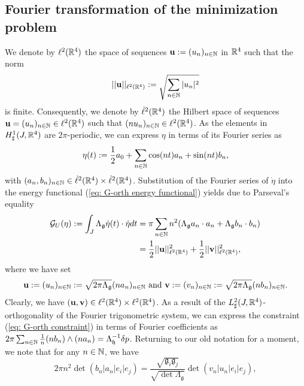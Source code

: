 \subsection{Fourier transformation of the minimization problem}
We denote by $\ell^2(\mathbb{R}^4)$ the space of sequences $\mathbf{u} := (u_n)_{n \in \mathbb{N}}$ in $\mathbb{R}^4$ such that the norm
\begin{equation}
	||\mathbf{u}||_{\ell^2(\mathbb{R}^4)} := \sqrt{ \sum_{n \in \mathbb{N}} |u_n|^2 }
\end{equation}
is finite. Consequently, we denote by $\dot{\ell}^2(\mathbb{R}^4)$ the Hilbert space of sequences $\mathbf{u} = (u_n)_{n \in \mathbb{N}} \in \ell^2(\mathbb{R}^4)$ such that $(n u_n)_{n \in \mathbb{N}} \in \ell^2(\mathbb{R}^4)$. As the elements in $H_{\sharp}^{1}(J, \mathbb{R}^4)$ are $2\pi$-periodic, we can express $\eta$ in terms of its Fourier series as
\begin{equation}
\eta(t) := \frac{1}{2} a_0 + \sum_{n \in \mathbb{N}} \cos(nt) a_n + \sin(n t) b_n,
\end{equation}
with $(a_n, b_n)_{n \in \mathbb{N}} \in \dot{\ell}^2(\mathbb{R}^4) \times \dot{\ell}^2(\mathbb{R}^4)$. Substitution of the Fourier series of $\dot{\eta}$ into the energy functional (\ref{eq: G-orth energy functional}) yields due to Parseval's equality
\begin{align}
\mathcal{G}_{U} (\eta) := \int_{J} \Lambda_{\mathfrak{g}} \dot{\eta}(t) \cdot \dot{\eta} dt &= \pi \sum_{n  \in \mathbb{N}} n^2(\Lambda_{\mathfrak{g}} a_n \cdot a_n + \Lambda_{\mathfrak{g}} b_n \cdot b_n) \\  &=
\frac{1}{2} ||\mathbf{u}||_{\ell^2(\mathbb{R}^4)}^2 + \frac{1}{2} ||\mathbf{v}||_{\ell^2(\mathbb{R}^4)}^2,
\end{align}
where we have set
\begin{align}
\label{eq:relation Fourier coeffs of eta}
	\mathbf{u} := (u_n)_{n \in \mathbb{N}} := \sqrt{2 \pi \Lambda_{\mathfrak{g}}}(n a_n)_{n \in \mathbb{N}} \text{ and } \mathbf{v} := (v_n)_{n \in \mathbb{N}} := \sqrt{2 \pi \Lambda_{\mathfrak{g}}} (n b_n)_{n \in \mathbb{N}}.
\end{align}
Clearly, we have $(\mathbf{u}, \mathbf{v}) \in \ell^2(\mathbb{R}^4) \times \ell^2(\mathbb{R}^4)$. As a result of the $L_{\sharp}^2(J, \mathbb{R}^4)$-orthogonality of the Fourier trigonometric system, we can express the constraint (\ref{eq: G-orth constraint}) in terms of Fourier coefficients as $2 \pi \sum_{n \in \mathbb{N}} \tfrac{1}{n} (nb_n) \wedge (n a_n) = \Lambda_{\mathfrak{h}}^{-1} \delta p$. Returning to our old notation for a moment, we note that for any $n \in \mathbb{N}$, we have
\begin{equation}
2 \pi n^2 \det(b_n | a_n | e_i | e_j) = \frac{\sqrt{\mathfrak{g}_i \mathfrak{g}_j}}{\sqrt{\det \Lambda_{\mathfrak{g}}}} \det(v_n | u_n |e_i | e_j),
\end{equation}
